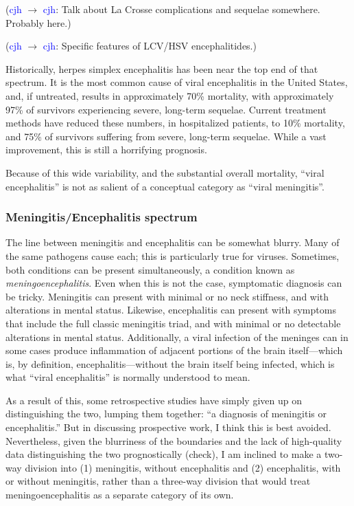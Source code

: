 \documentclass[12pt]{article}
\newcommand{\cjh}{\textcolor{blue}{cjh}}
\newcommand{\msg}[3]{(#1 $\rightarrow$ #2: #3)}
\newcommand{\mcc}[1]{\msg\cjh\cjh{#1}}
\begin{document}
            \mcc{Talk about La Crosse complications and sequelae somewhere. Probably here.}

            \mcc{Specific features of LCV/HSV encephalitides.}

            Historically, herpes simplex encephalitis has been near the top end of that spectrum. It is the most common cause of viral encephalitis in the United States, and, if untreated, results in approximately 70\% mortality, with approximately 97\% of survivors experiencing severe, long-term sequelae. Current treatment methods have reduced these numbers, in hospitalized patients, to 10\% mortality, and 75\% of survivors suffering from severe, long-term sequelae. While a vast improvement, this is still a horrifying prognosis.
            
            Because of this wide variability, and the substantial overall mortality, ``viral encephalitis'' is not as salient of a conceptual category as ``viral meningitis''. 

        \subsubsection{Meningitis/Encephalitis spectrum}
            The line between meningitis and encephalitis can be somewhat blurry. Many of the same pathogens cause each; this is particularly true for viruses. Sometimes, both conditions can be present simultaneously, a condition known as \textit{meningoencephalitis}. Even when this is not the case, symptomatic diagnosis can be tricky. Meningitis can present with minimal or no neck stiffness, and with alterations in mental status. Likewise, encephalitis can present with symptoms that include the full classic meningitis triad, and with minimal or no detectable alterations in mental status. Additionally, a viral infection of the meninges can in some cases produce inflammation of adjacent portions of the brain itself---which is, by definition, encephalitis---without the brain itself being infected, which is what ``viral encephalitis'' is normally understood to mean.

            As a result of this, some retrospective studies have simply given up on distinguishing the two, lumping them together: ``a diagnosis of meningitis or encephalitis.'' But in discussing prospective work, I think this is best avoided. Nevertheless, given the blurriness of the boundaries and the lack of high-quality data distinguishing the two prognostically (check), I am inclined to make a two-way division into (1) meningitis, without encephalitis and (2) encephalitis, with or without meningitis, rather than a three-way division that would treat meningoencephalitis as a separate category of its own.
        
\end{document}

